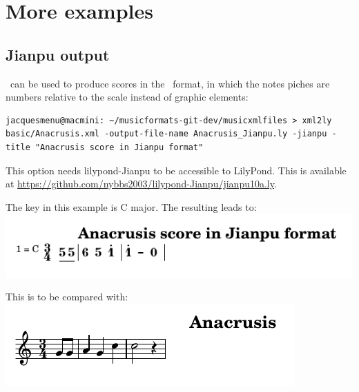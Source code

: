 
\chapter{More examples}


\section{Jianpu output}

\xmlToLy\ can be used to produce scores in the \jianpu\ format, in which the notes piches are numbers relative to the scale instead of graphic elements:
\begin{lstlisting}[language=Terminal]
jacquesmenu@macmini: ~/musicformats-git-dev/musicxmlfiles > xml2ly basic/Anacrusis.xml -output-file-name Anacrusis_Jianpu.ly -jianpu -title "Anacrusis score in Jianpu format"
\end{lstlisting}

This option needs lilypond-Jianpu to be accessible to LilyPond. This is available at \url{https://github.com/nybbs2003/lilypond-Jianpu/jianpu10a.ly}.
          
The key in this example is C major. The resulting  leads to:\\
\includegraphics[scale=1]{../graphics/Anacrusis_Jianpu.png}

This is to be compared with:\\
\includegraphics[scale=1]{../graphics/Anacrusis.png}


